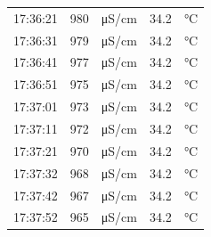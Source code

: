 \documentclass[11pt]{article}
\begin{document}
\begin{enumerate}
\begin{center}
\begin{tabular}{rrlrl}
17:36:21 & 980 & μS/cm & 34.2 & °C\\
17:36:31 & 979 & μS/cm & 34.2 & °C\\
17:36:41 & 977 & μS/cm & 34.2 & °C\\
17:36:51 & 975 & μS/cm & 34.2 & °C\\
17:37:01 & 973 & μS/cm & 34.2 & °C\\
17:37:11 & 972 & μS/cm & 34.2 & °C\\
17:37:21 & 970 & μS/cm & 34.2 & °C\\
17:37:32 & 968 & μS/cm & 34.2 & °C\\
17:37:42 & 967 & μS/cm & 34.2 & °C\\
17:37:52 & 965 & μS/cm & 34.2 & °C\\
\end{tabular}
\end{center}


\end{enumerate}
\end{document}
